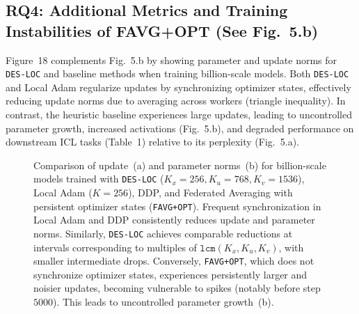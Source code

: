 \subsection{RQ4: Additional Metrics and Training Instabilities of FAVG+OPT (See Fig.~5.b)}
\label{sec:b4_favgopt}

Figure~18 complements Fig.~5.b by showing parameter and update norms for \texttt{DES-LOC} and baseline methods when training billion-scale models. Both \texttt{DES-LOC} and Local Adam regularize updates by synchronizing optimizer states, effectively reducing update norms due to averaging across workers (triangle inequality). In contrast, the heuristic baseline \citep{Sani2025} experiences large updates, leading to uncontrolled parameter growth, increased activations (Fig.~5.b), and degraded performance on downstream ICL tasks (Table~1) relative to its perplexity (Fig.~5.a).

\begin{figure}[ht]
\centering
\caption{Comparison of update~(a) and parameter norms~(b) for billion-scale models trained with \texttt{DES-LOC} ($K_x=256, K_u=768, K_v=1536$), Local Adam ($K=256$), DDP, and Federated Averaging with persistent optimizer states (\texttt{FAVG+OPT}). Frequent synchronization in Local Adam and DDP consistently reduces update and parameter norms. Similarly, \texttt{DES-LOC} achieves comparable reductions at intervals corresponding to multiples of $\texttt{lcm}(K_x, K_u, K_v)$, with smaller intermediate drops. Conversely, \texttt{FAVG+OPT}, which does not synchronize optimizer states, experiences persistently larger and noisier updates, becoming vulnerable to spikes (notably before step $5000$). This leads to uncontrolled parameter growth~(b).}
\label{fig:18}
\end{figure}

